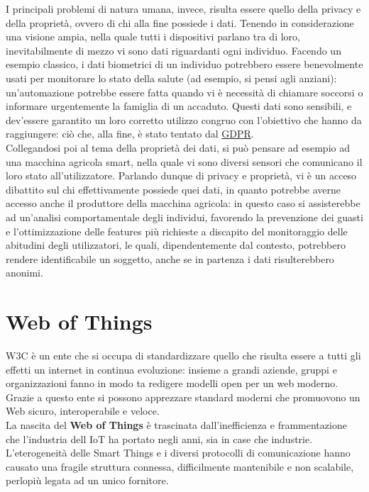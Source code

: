 \documentclass[12pt,a4paper,openright,oneside]{report}
\begin{document}
I principali problemi di natura umana, invece, risulta essere quello della privacy e della proprietà, ovvero di chi alla fine possiede i dati. Tenendo in considerazione una visione ampia, nella quale tutti i dispositivi parlano tra di loro, inevitabilmente di mezzo vi sono dati riguardanti ogni individuo. Facendo un esempio classico, i dati biometrici di un individuo potrebbero essere benevolmente usati per monitorare lo stato della salute (ad esempio, si pensi agli anziani): un'automazione potrebbe essere fatta quando vi è necessità di chiamare soccorsi o informare urgentemente la famiglia di un accaduto. Questi dati sono sensibili, e dev'essere garantito un loro corretto utilizzo congruo con l'obiettivo che hanno da raggiungere: ciò che, alla fine, è stato tentato dal \href{https://eur-lex.europa.eu/legal-content/IT/TXT/?uri=uriserv:OJ.L_.2016.119.01.0001.01.ITA&toc=OJ:L:2016:119:TOC}{GDPR}.\\

Collegandosi poi al tema della proprietà dei dati, si può pensare ad esempio ad una macchina agricola smart, nella quale vi sono diversi sensori che comunicano il loro stato all'utilizzatore. Parlando dunque di privacy e proprietà, vi è un acceso dibattito sul chi effettivamente possiede quei dati, in quanto potrebbe averne accesso anche il produttore della macchina agricola: in questo caso si assisterebbe ad un'analisi comportamentale degli individui, favorendo la prevenzione dei guasti e l'ottimizzazione delle features più richieste a discapito del monitoraggio delle abitudini degli utilizzatori, le quali, dipendentemente dal contesto, potrebbero rendere identificabile un soggetto, anche se in partenza i dati risulterebbero anonimi.\\


\section{Web of Things}
\label{sec:w3c}
\label{sec:wot}
W3C {\cite{w3c}} è un ente che si occupa di standardizzare quello che risulta essere a tutti gli effetti un internet in continua evoluzione: insieme a grandi aziende, gruppi e organizzazioni fanno in modo ta redigere modelli open per un web moderno. Grazie a questo ente si possono apprezzare standard moderni che promuovono un Web sicuro, interoperabile e veloce.\\

La nascita del \textbf{Web of Things} \cite{wot} è trascinata dall'inefficienza e frammentazione che l'industria dell IoT ha portato negli anni, sia in case che industrie. L'eterogeneità delle Smart Things e i diversi protocolli di comunicazione hanno causato una fragile struttura connessa, difficilmente mantenibile e non scalabile, perlopiù legata ad un unico fornitore.\\
\end{document}

